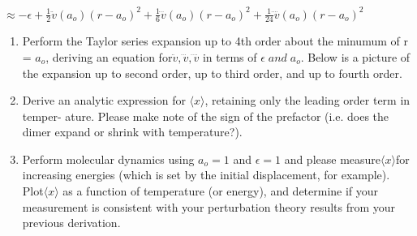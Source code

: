 \documentclass[12pt]{article}
\begin{document}
\begin{enumerate}
\begin{center}
	$\approx -\epsilon + \frac{1}{2}\ddot{v}(a_o)(r-a_o)^2+ \frac{1}{6}\dddot{v}(a_o)(r-a_o)^2+ \frac{1}{24}\ddddot{v}(a_o)(r-a_o)^2$
	\end{center}
	\begin{enumerate}
	\item Perform the Taylor series expansion up to 4th order about the minumum of r = $a_o$, deriving an equation for$\ddot{v},\dddot{v},\ddddot{v}$ in terms of $\epsilon\;and \;a_o$. Below is a picture of the expansion up to second order, up to third order, and up to fourth order.
	\item Derive an analytic expression for $\langle x \rangle$, retaining only the leading order term in temper- ature. Please make note of the sign of the prefactor (i.e. does the dimer expand or shrink with temperature?).
	\item Perform molecular dynamics using $ a_o = 1$ and $\epsilon = 1 $ and please measure$ \langle x \rangle $for increasing energies (which is set by the initial displacement, for example). Plot$ \langle x \rangle $ as a function of temperature (or energy), and determine if your measurement is consistent with your perturbation theory results from your previous derivation.
\end{enumerate}

\end{enumerate}
\end{document}
